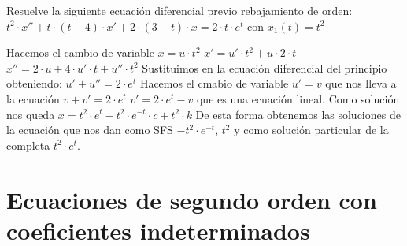 \begin{ejer}
	Resuelve la siguiente ecuación diferencial previo rebajamiento de orden: $t^2\cdot x'' + t\cdot (t-4)\cdot x' + 2\cdot (3-t)\cdot x = 2\cdot t\cdot e^t$ con $x_1(t) = t^2$
\end{ejer}
\begin{sol}
	Hacemos el cambio de variable $x= u\cdot t^2$  
	$x' = u'\cdot t^2 + u\cdot 2\cdot t$  
	$x'' = 2\cdot u + 4\cdot u'\cdot t + u''\cdot t^2$  
	Sustituimos en la ecuación diferencial del principio obteniendo:
	$u'+u'' = 2\cdot e^t$  
	Hacemos el cmabio de variable $u' = v$ que nos lleva a la ecuación $v+v' = 2\cdot e^t$  
	$v' = 2\cdot e^t  - v$ que es una ecuación lineal.  
	Como solución nos queda $x = t^2\cdot e^t - t^2\cdot e^{-t}\cdot c + t^2\cdot k$  
	De esta forma obtenemos las soluciones de la ecuación que nos dan como SFS $-t^2\cdot e^{-t}$, $t^2$ y como solución particular de la completa $t^2\cdot e^t$.
\end{sol}


\section{Ecuaciones de segundo orden con coeficientes indeterminados}

